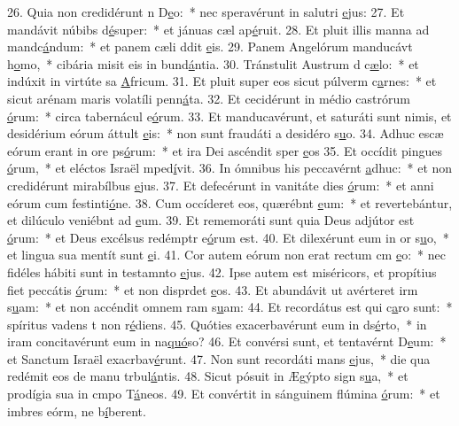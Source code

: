 26. Quia non credidérunt n D\uline{e}o:~* nec speravérunt in salutri \uline{e}jus:
27. Et mandávit núbibs d\uline{é}super:~* et jánuas cæl ap\uline{é}ruit.
28. Et pluit illis manna ad mandc\uline{á}ndum:~* et panem cæli ddit \uline{e}is.
29. Panem Angelórum manducávt h\uline{o}mo,~* cibária misit eis in bund\uline{á}ntia.
30. Tránstulit Austrum d c\uline{æ}lo:~* et indúxit in virtúte sa \uline{A}fricum.
31. Et pluit super eos sicut púlverm c\uline{a}rnes:~* et sicut arénam maris volatíli penn\uline{á}ta.
32. Et cecidérunt in médio castrórum \uline{ó}rum:~* circa tabernácul e\uline{ó}rum.
33. Et manducavérunt, et saturáti sunt nimis, et desidérium eórum áttult \uline{e}is:~* non sunt fraudáti a desidéro s\uline{u}o.
34. Adhuc escæ eórum erant in ore ps\uline{ó}rum:~* et ira Dei ascéndit sper \uline{e}os
35. Et occídit pingues \uline{ó}rum,~* et eléctos Israël mped\uline{í}vit.
36. In ómnibus his peccavérnt \uline{a}dhuc:~* et non credidérunt mirabílbus \uline{e}jus.
37. Et defecérunt in vanitáte dies \uline{ó}rum:~* et anni eórum cum festinti\uline{ó}ne.
38. Cum occíderet eos, quærébnt \uline{e}um:~* et revertebántur, et dilúculo veniébnt ad \uline{e}um.
39. Et rememoráti sunt quia Deus adjútor est \uline{ó}rum:~* et Deus excélsus redémptr e\uline{ó}rum est.
40. Et dilexérunt eum in or s\uline{u}o,~* et lingua sua mentít sunt \uline{e}i.
41. Cor autem eórum non erat rectum cm \uline{e}o:~* nec fidéles hábiti sunt in testamnto \uline{e}jus.
42. Ipse autem est miséricors, et propítius fiet peccátis \uline{ó}rum:~* et non disprdet \uline{e}os.
43. Et abundávit ut avérteret irm s\uline{u}am:~* et non accéndit omnem ram s\uline{u}am:
44. Et recordátus est qui c\uline{a}ro sunt:~* spíritus vadens t non r\uline{é}diens.
45. Quóties exacerbavérunt eum in ds\uline{é}rto,~* in iram concitavérunt eum in na\uline{quó}so?
46. Et convérsi sunt, et tentavérnt D\uline{e}um:~* et Sanctum Israël exacrbav\uline{é}runt.
47. Non sunt recordáti mans \uline{e}jus,~* die qua redémit eos de manu trbul\uline{á}ntis.
48. Sicut pósuit in Ægýpto sign s\uline{u}a,~* et prodígia sua in cmpo T\uline{á}neos.
49. Et convértit in sánguinem flúmina \uline{ó}rum:~* et imbres eórm, ne b\uline{í}berent.
